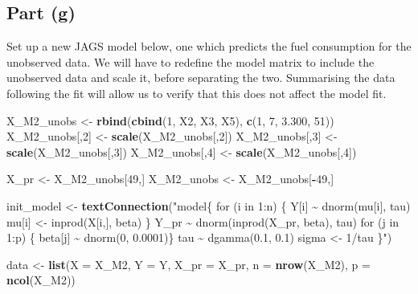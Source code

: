 \documentclass[
]{homework}
\newenvironment{Shaded}{\begin{snugshade}}{\end{snugshade}}
\newcommand{\AttributeTok}[1]{\textcolor[rgb]{0.13,0.29,0.53}{#1}}
\newcommand{\DecValTok}[1]{\textcolor[rgb]{0.00,0.00,0.81}{#1}}
\newcommand{\FloatTok}[1]{\textcolor[rgb]{0.00,0.00,0.81}{#1}}
\newcommand{\FunctionTok}[1]{\textcolor[rgb]{0.13,0.29,0.53}{\textbf{#1}}}
\newcommand{\NormalTok}[1]{#1}
\newcommand{\OtherTok}[1]{\textcolor[rgb]{0.56,0.35,0.01}{#1}}
\newcommand{\SpecialCharTok}[1]{\textcolor[rgb]{0.81,0.36,0.00}{\textbf{#1}}}
\newcommand{\StringTok}[1]{\textcolor[rgb]{0.31,0.60,0.02}{#1}}
\begin{document}
\subsection{Part (g)}\label{part-g-1}

Set up a new \textsf{JAGS} model below, one which predicts the fuel consumption for the unobserved data. We will have to redefine the model matrix to include the unobserved data and scale it, before separating the two. Summarising the data following the fit will allow us to verify that this does not affect the model fit.

\begin{Shaded}
\begin{Highlighting}[]
\NormalTok{X\_M2\_unobs }\OtherTok{\textless{}{-}} \FunctionTok{rbind}\NormalTok{(}\FunctionTok{cbind}\NormalTok{(}\DecValTok{1}\NormalTok{, X2, X3, X5), }\FunctionTok{c}\NormalTok{(}\DecValTok{1}\NormalTok{, }\DecValTok{7}\NormalTok{, }\FloatTok{3.300}\NormalTok{, }\DecValTok{51}\NormalTok{))}
\NormalTok{X\_M2\_unobs[,}\DecValTok{2}\NormalTok{] }\OtherTok{\textless{}{-}} \FunctionTok{scale}\NormalTok{(X\_M2\_unobs[,}\DecValTok{2}\NormalTok{])}
\NormalTok{X\_M2\_unobs[,}\DecValTok{3}\NormalTok{] }\OtherTok{\textless{}{-}} \FunctionTok{scale}\NormalTok{(X\_M2\_unobs[,}\DecValTok{3}\NormalTok{])}
\NormalTok{X\_M2\_unobs[,}\DecValTok{4}\NormalTok{] }\OtherTok{\textless{}{-}} \FunctionTok{scale}\NormalTok{(X\_M2\_unobs[,}\DecValTok{4}\NormalTok{])}

\NormalTok{X\_pr       }\OtherTok{\textless{}{-}}\NormalTok{ X\_M2\_unobs[}\DecValTok{49}\NormalTok{,]}
\NormalTok{X\_M2\_unobs }\OtherTok{\textless{}{-}}\NormalTok{ X\_M2\_unobs[}\SpecialCharTok{{-}}\DecValTok{49}\NormalTok{,]}

\NormalTok{init\_model }\OtherTok{\textless{}{-}} \FunctionTok{textConnection}\NormalTok{(}\StringTok{"model\{}
\StringTok{  for (i in 1:n) \{}
\StringTok{    Y[i]  \textasciitilde{} dnorm(mu[i], tau)}
\StringTok{    mu[i]   \textless{}{-} inprod(X[i,], beta)}
\StringTok{  \}}
\StringTok{  }
\StringTok{  Y\_pr \textasciitilde{} dnorm(inprod(X\_pr, beta), tau)}
\StringTok{  }
\StringTok{  for (j in 1:p) \{ beta[j] \textasciitilde{} dnorm(0, 0.0001)\}}
\StringTok{  }
\StringTok{  tau   \textasciitilde{} dgamma(0.1, 0.1)}
\StringTok{  sigma \textless{}{-} 1/tau}
\StringTok{\}"}\NormalTok{)}

\NormalTok{data }\OtherTok{\textless{}{-}} \FunctionTok{list}\NormalTok{(}\AttributeTok{X =}\NormalTok{ X\_M2, }\AttributeTok{Y =}\NormalTok{ Y, }\AttributeTok{X\_pr =}\NormalTok{ X\_pr, }\AttributeTok{n =} \FunctionTok{nrow}\NormalTok{(X\_M2), }\AttributeTok{p =} \FunctionTok{ncol}\NormalTok{(X\_M2))}


\end{Highlighting}
\end{Shaded}
\end{document}
